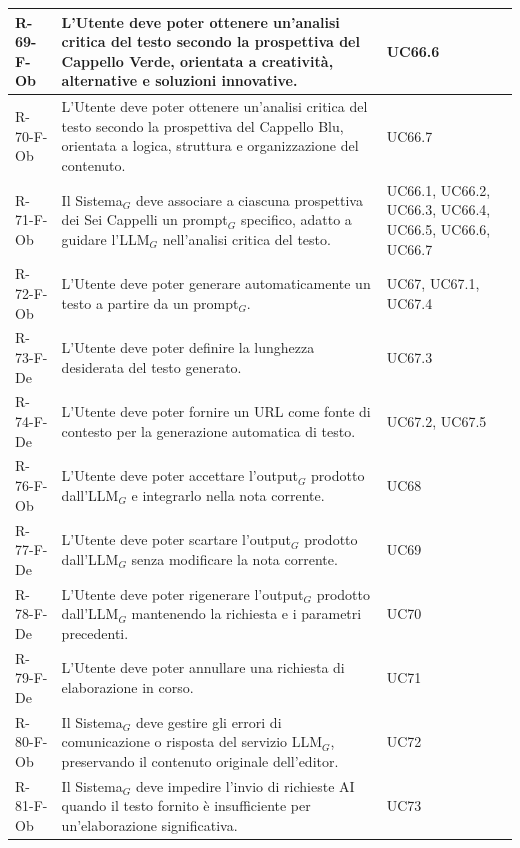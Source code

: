 \documentclass[a4paper, 10pt]{article}
\begin{document}
\begin{longtable}{|p{2.2cm}|p{7.5cm}|p{4cm}|}
R-69-F-Ob & L'Utente deve poter ottenere un'analisi critica del testo secondo la prospettiva del Cappello Verde, orientata a creatività, alternative e soluzioni innovative. & UC66.6 \\ \hline

R-70-F-Ob & L'Utente deve poter ottenere un'analisi critica del testo secondo la prospettiva del Cappello Blu, orientata a logica, struttura e organizzazione del contenuto. & UC66.7 \\ \hline

R-71-F-Ob & Il Sistema$_G$ deve associare a ciascuna prospettiva dei Sei Cappelli un prompt$_G$ specifico, adatto a guidare l'LLM$_G$ nell'analisi critica del testo. & UC66.1, UC66.2, UC66.3, UC66.4, UC66.5, UC66.6, UC66.7 \\ \hline

R-72-F-Ob & L'Utente deve poter generare automaticamente un testo a partire da un prompt$_G$. & UC67, UC67.1, UC67.4 \\ \hline

R-73-F-De & L'Utente deve poter definire la lunghezza desiderata del testo generato. & UC67.3 \\ \hline

R-74-F-De & L'Utente deve poter fornire un URL come fonte di contesto per la generazione automatica di testo. & UC67.2, UC67.5 \\ \hline

R-76-F-Ob & L'Utente deve poter accettare l'output$_G$ prodotto dall'LLM$_G$ e integrarlo nella nota corrente. & UC68 \\ \hline

R-77-F-De & L'Utente deve poter scartare l'output$_G$ prodotto dall'LLM$_G$ senza modificare la nota corrente. & UC69 \\ \hline

R-78-F-De & L'Utente deve poter rigenerare l'output$_G$ prodotto dall'LLM$_G$ mantenendo la richiesta e i parametri precedenti. & UC70 \\ \hline

R-79-F-De & L'Utente deve poter annullare una richiesta di elaborazione in corso. & UC71 \\ \hline

R-80-F-Ob & Il Sistema$_G$ deve gestire gli errori di comunicazione o risposta del servizio LLM$_G$, preservando il contenuto originale dell'editor. & UC72 \\ \hline

R-81-F-Ob & Il Sistema$_G$ deve impedire l'invio di richieste AI quando il testo fornito è insufficiente per un'elaborazione significativa. & UC73 \\ \hline


\end{longtable}
\end{document}
